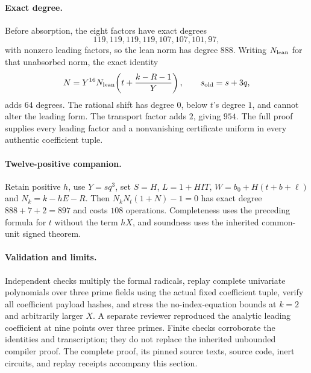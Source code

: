 \paragraph{Exact degree.}
Before absorption, the eight factors have exact degrees
\[
 119,119,119,119,107,107,101,97,
\]
with nonzero leading factors, so the lean norm has degree $888$.
Writing $N_{\rm lean}$ for that unabsorbed norm, the exact identity
\[
 N=Y^{16}N_{\rm lean}\!\left(t+\frac{k-R-1}{Y}\right),
 \qquad s_{\rm old}=s+3q,
\]
adds $64$ degrees. The rational shift has degree $0$, below $t$'s degree $1$,
and cannot alter the leading form. The transport factor adds $2$, giving
$954$. The full proof supplies every leading factor and a nonvanishing
certificate uniform in every authentic coefficient tuple.

\paragraph{Twelve-positive companion.}
Retain positive $h$, use $Y=sq^3$, set
$S=H$, $L=1+HIT$, $W=b_0+H(t+b+\ell)$ and $N_k=k-hE-R$.
Then $N_kN_t(1+N)-1=0$ has exact degree $888+7+2=897$ and costs
$108$ operations. Completeness uses the preceding formula for $t$ without
the term $hX$, and soundness uses the inherited common-unit signed theorem.

\paragraph{Validation and limits.}
Independent checks multiply the formal radicals, replay complete univariate
polynomials over three prime fields using the actual fixed coefficient tuple,
verify all coefficient payload hashes, and stress the no-index-equation
bounds at $k=2$ and arbitrarily larger $X$. A separate reviewer reproduced
the analytic leading coefficient at nine points over three primes. Finite
checks corroborate the identities and transcription; they do not replace
the inherited unbounded compiler proof. The complete proof, its pinned source
texts, source code, inert circuits, and replay receipts accompany this section.

